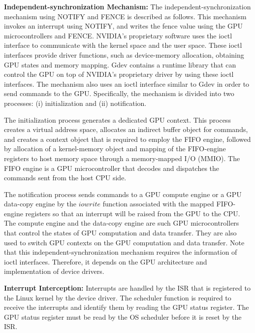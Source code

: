\textbf{Independent-synchronization Mechanism:} The independent-synchronization mechanism using NOTIFY and FENCE is described as follows.
This mechanism invokes an interrupt using NOTIFY, and writes the fence value using the GPU microcontrollers and FENCE.
NVIDIA's proprietary software uses the ioctl interface to communicate with the kernel space and the user space.
These ioctl interfaces provide driver functions, such as device-memory allocation, obtaining GPU states and memory mapping.
Gdev contains a runtime library that can control the GPU on top of NVIDIA's proprietary driver by using these ioctl interfaces.
The mechanism also uses an ioctl interface similar to Gdev in order to send commands to the GPU.
Specifically, the mechanism is divided into two processes: (i) initialization and (ii) notification.

The initialization process generates a dedicated GPU context.
This process creates a virtual address space, allocates an indirect buffer object for commands, and creates a context object that is required to employ the FIFO engine, followed by allocation of a kernel-memory object and mapping of the FIFO-engine registers to host memory space through a memory-mapped I/O (MMIO).
The FIFO engine is a GPU microcontroller that decodes and dispatches the commands sent from the host CPU side.

The notification process sends commands to a GPU compute engine or a GPU data-copy engine by the $iowrite$ function associated with the mapped FIFO-engine registers so that an interrupt will be raised from the GPU to the CPU.
The compute engine and the data-copy engine are such GPU microcontrollers that control the states of GPU computation and data transfer.
They are also used to switch GPU contexts on the GPU computation and data transfer.
Note that this independent-synchronization mechanism requires the information of ioctl interfaces.
Therefore, it depends on the GPU architecture and implementation of device drivers.

\textbf{Interrupt Interception:} Interrupts are handled by the ISR that is registered to the Linux kernel by the device driver.
The scheduler function is required to receive the interrupts and identify them by reading the GPU status register.
The GPU status register must be read by the OS scheduler before it is reset by the ISR.

